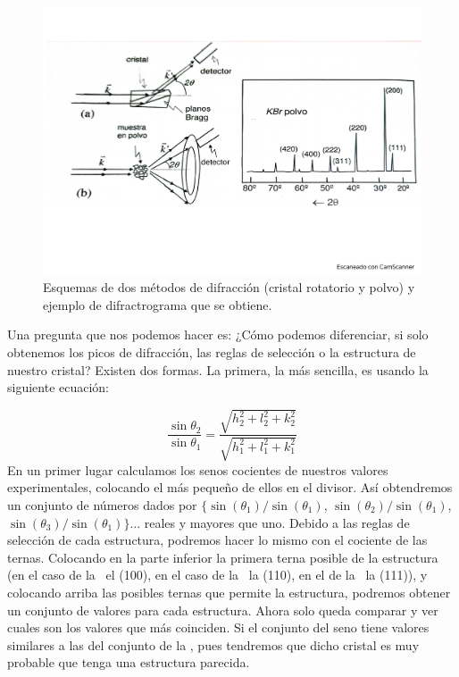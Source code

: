     
\begin{figure}[h!] \centering
    \includegraphics[scale=0.35]{Cuerpo/Ch_02/Fotos_libro 8.pdf}
    \caption{Esquemas de dos métodos de difracción (cristal rotatorio y polvo) y ejemplo de difractrograma que se obtiene.}
    \label{Fig:02-08}
\end{figure}

Una pregunta que nos podemos hacer es: ¿Cómo podemos diferenciar, si solo obtenemos los picos de difracción, las reglas de selección o la estructura de nuestro cristal? Existen dos formas. La primera, la más sencilla, es usando la siguiente ecuación:

\begin{equation}
    \frac{\sin \theta_2}{\sin \theta_1} = \frac{\sqrt{h_2^2+l_2^2+k_2^2}}{\sqrt{h_1^2+l_1^2+k_1^2}}
\end{equation}
En un primer lugar calculamos los senos cocientes de nuestros valores experimentales, colocando el más pequeño de ellos en el divisor. Así obtendremos un conjunto de números dados por $\{ \sin(\theta_1)/\sin(\theta_1)$, $\sin(\theta_2)/\sin(\theta_1)$, $\sin(\theta_3)/\sin(\theta_1) \}$... reales y mayores que uno. Debido a las reglas de selección de cada estructura, podremos hacer lo mismo con el cociente de las ternas. Colocando en la parte inferior la primera terna posible de la estructura (en el caso de la \sc \ el (100), en el caso de la \bcc \ la (110), en el de la \fcc \ la (111)), y colocando arriba las posibles ternas que permite la estructura, podremos obtener un conjunto de valores para cada estructura. Ahora solo queda comparar y ver cuales son los valores que más coinciden. Si el conjunto del seno tiene valores similares a las del conjunto de la \fcc, pues tendremos que dicho cristal es muy probable que tenga una estructura parecida. \\

